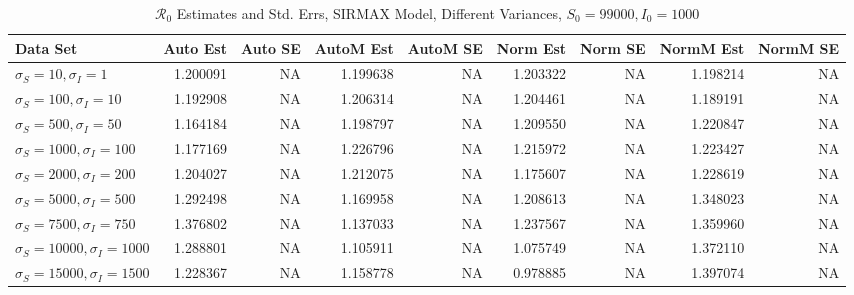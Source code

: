 \documentclass[12pt]{article}
\newcommand{\rr}{\ensuremath{\mathcal{R}_0}}
\begin{document}
\begin{table}[H]
	
	\caption{$\rr$ Estimates and Std. Errs, SIRMAX Model,
		Different Variances, 
		$S_0 = 99000, I_0 = 1000$}
	\begin{footnotesize}
		\hskip -1.7cm
	\begin{tabular}{l|r|r|r|r|r|r|r|r}
		\hline
		Data Set & Auto Est & Auto SE & AutoM Est & AutoM SE & Norm Est & Norm SE & NormM Est & NormM SE\\
		\hline
		$\sigma_S = 10, \sigma_I = 1$ & 1.200091 & NA & 1.199638 & NA & 1.203322 & NA & 1.198214 & NA\\
		\hline
		$\sigma_S = 100, \sigma_I = 10$ & 1.192908 & NA & 1.206314 & NA & 1.204461 & NA & 1.189191 & NA\\
		\hline
		$\sigma_S = 500, \sigma_I = 50$ & 1.164184 & NA & 1.198797 & NA & 1.209550 & NA & 1.220847 & NA\\
		\hline
		$\sigma_S = 1000, \sigma_I = 100$ & 1.177169 & NA & 1.226796 & NA & 1.215972 & NA & 1.223427 & NA\\
		\hline
		$\sigma_S = 2000, \sigma_I = 200$ & 1.204027 & NA & 1.212075 & NA & 1.175607 & NA & 1.228619 & NA\\
		\hline
		$\sigma_S = 5000, \sigma_I = 500$ & 1.292498 & NA & 1.169958 & NA & 1.208613 & NA & 1.348023 & NA\\
		\hline
		$\sigma_S = 7500, \sigma_I = 750$ & 1.376802 & NA & 1.137033 & NA & 1.237567 & NA & 1.359960 & NA\\
		\hline
		$\sigma_S = 10000, \sigma_I = 1000$ & 1.288801 & NA & 1.105911 & NA & 1.075749 & NA & 1.372110 & NA\\
		\hline
		$\sigma_S = 15000, \sigma_I = 1500$ & 1.228367 & NA & 1.158778 & NA & 0.978885 & NA & 1.397074 & NA\\
		\hline
	\end{tabular}
\end{footnotesize}
\end{table}
\end{document}
